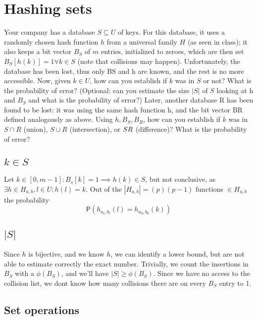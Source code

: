 \documentclass{article}
\newcommand*{\prob}{\mathsf{P}}     %
\begin{document}
\newpage
\section{Hashing sets}

Your company has a database $S \subseteq U$ of keys. For this database, it uses
a randomly chosen hash function $h$ from a universal family $H$ (as seen in class);
it also keeps a bit vector $B_S$ of $m$ entries, initialized to zeroes, which are
then set $B_S[h(k)] = 1 \forall k \in S$ (note that collisions may happen).
Unfortunately, the database has been lost, thus only BS and h are known, and the
rest is no more accessible.
Now, given $k \in U$, how can you establish if $k$ was in $S$ or not?
What is the probability of error? (Optional: can you estimate the size $|S|$ of
$S$ looking at h and $B_S$ and what is the probability of error?)
Later, another database R has been found to be lost: it was using the same hash
function h, and the bit vector BR defined analogously as above.
Using $h, B_S, B_R$, how can you establish if $k$ was in $S \cap R$ (union), $S \cup R$
(intersection), or $S \\ R$ (difference)? What is the probability of error?

\subsection{$k \in S$}
\label{k_in_s}

Let $k \in [0, m - 1]: B_s[k] = 1 \implies h(k) \in S$, but not conclusive, as
$\exists h \in H_{a,b}, l \in U: h(l) = k$.
Out of the $|H_{a, b}| = (p)(p - 1)$ functions $\in H_{a, b}$ the probability
    \begin{equation}
    \prob(h_{a_{i},b_{i}}(l) = h_{a_{0},b_{0}}(k))
    \end{equation}

\subsection{$|S|$}
\label{size_of_S}

Since $h$ is bijective, and we know $h$, we can identify a lower bound, but are
not able to estimate correctly the exact number.
Trivially, we count the insertions in $B_S$ with a $\phi(B_S)$, and we'll have
$|S| \geq \phi(B_S)$.
Since we have no access to the collision list, we dont know how many collisions
there are on every $B_S$ entry to 1.

\subsection{Set operations}
\end{document}
